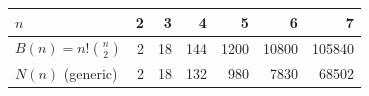 \begin{tabular}{@{}lrrrrrr@{}}
\toprule
$n$ & 2 & 3 & 4 & 5 & 6 & 7 \\
\midrule
$B(n)=n!\binom n2$ & 2 & 18 & 144 & 1200 & 10800 & 105840 \\
$N(n)$ (generic) & 2 & 18 & 132 & 980 & 7830 & 68502 \\
\bottomrule
\end{tabular}

